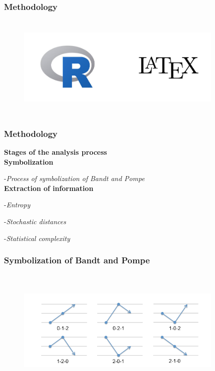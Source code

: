 \documentclass[10pt, compress]{beamer}
\begin{document}
\begin{frame}[fragile]
\frametitle{Methodology}

\begin{figure}
  \centering
   \includegraphics[width=10cm,height=5cm]{ferramentas.png}
\end{figure}

\end{frame}


\begin{frame}[fragile]
\frametitle{Methodology}
 
\textbf{\Large Stages of the analysis process}\\

\textbf{Symbolization}

-\textit{Process of symbolization of Bandt and Pompe}\\

\textbf{Extraction of information}

-\textit{Entropy} 

-\textit{Stochastic distances}

-\textit{Statistical complexity} 

\end{frame}

\begin{frame}[fragile]
\frametitle{Symbolization of Bandt and Pompe}

\begin{figure}
  \centering
   \includegraphics[width=10cm,height=6cm]{p.png}
\end{figure}
\end{frame}
\end{document}
